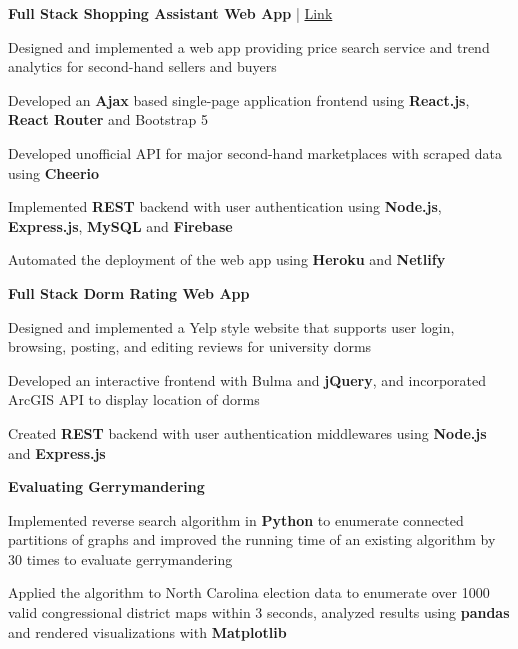\textbf{Full Stack Shopping Assistant Web App} 
| \href{https://thrifters-toolbox.netlify.app/}{Link}
\vspace{-3mm}
\begin{zitemize}

\item Designed and implemented a web app providing price search service and trend analytics for second-hand sellers and buyers

\item Developed an \textbf{Ajax} based single-page application frontend using \textbf{React.js}, \textbf{React Router} and Bootstrap 5

\item Developed unofficial API for major second-hand marketplaces with scraped data using \textbf{Cheerio}

\item Implemented \textbf{REST} backend with user authentication using \textbf{Node.js}, \textbf{Express.js}, \textbf{MySQL} and \textbf{Firebase}

\item Automated the deployment of the web app using \textbf{Heroku} and \textbf{Netlify}
\end{zitemize}

\textbf{Full Stack Dorm Rating Web App}
\vspace{-4mm}

\begin{zitemize}

\item Designed and implemented a Yelp style website that supports user login, browsing, posting, and editing reviews for university dorms

\item Developed an interactive frontend with Bulma and \textbf{jQuery}, and incorporated ArcGIS API to display location of dorms

\item Created \textbf{REST} backend with user authentication middlewares using \textbf{Node.js} and \textbf{Express.js}

\end{zitemize}

\textbf{Evaluating Gerrymandering}
\vspace{-4mm}

\begin{zitemize}

\item Implemented reverse search algorithm in \textbf{Python} to enumerate connected partitions of graphs and improved the running time of an existing algorithm by 30 times to evaluate gerrymandering

\item Applied the algorithm to North Carolina election data to enumerate over 1000 valid congressional district maps within 3 seconds, analyzed results using \textbf{pandas} and rendered visualizations with \textbf{Matplotlib}

\end{zitemize}

